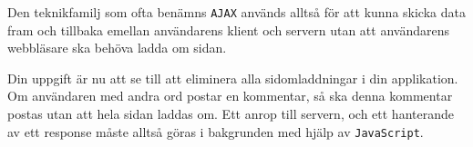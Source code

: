 \documentclass[12pt]{article}
\begin{document}
Den teknikfamilj som ofta benämns \texttt{AJAX} används alltså för att kunna skicka data fram och tillbaka emellan användarens klient och servern utan att användarens webbläsare ska behöva ladda om sidan.

Din uppgift är nu att se till att eliminera alla sidomladdningar i din applikation. Om användaren med andra ord postar en kommentar, så ska denna kommentar postas utan att hela sidan laddas om. Ett anrop till servern, och ett hanterande av ett response måste alltså göras i bakgrunden med hjälp av \texttt{JavaScript}.
\end{document}
